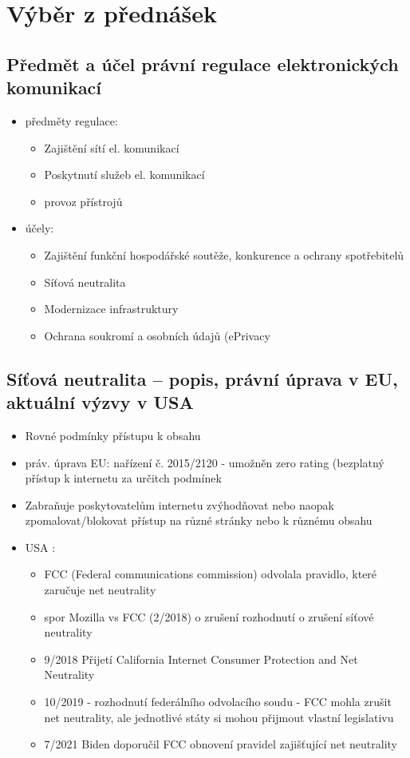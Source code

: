 \section{Výběr z přednášek}

\subsection{Předmět a účel právní regulace elektronických komunikací}
\begin{itemize}
    \item předměty regulace:
    \begin{itemize}
        \item Zajištění sítí el. komunikací
        \item Poskytnutí služeb el. komunikací
        \item provoz přístrojů
    \end{itemize}
    \item účely:
    \begin{itemize}
        \item Zajištění funkční hospodářské soutěže, konkurence a ochrany spotřebitelů
        \item Síťová neutralita
        \item Modernizace infrastruktury
        \item Ochrana soukromí a osobních údajů (ePrivacy
    \end{itemize}
\end{itemize}


\subsection{Síťová neutralita -- popis, právní úprava v EU, aktuální výzvy v USA}
\begin{itemize}
    \item Rovné podmínky přístupu k obsahu
    \item práv. úprava EU: nařízení č. 2015/2120 - umožněn zero rating (bezplatný přístup k internetu za určitch podmínek
    \item Zabraňuje poskytovatelům internetu zvýhodňovat nebo naopak zpomalovat/blokovat přístup na různé stránky nebo k různému obsahu
    \item USA : \begin{itemize}
        \item  FCC (Federal communications commission) odvolala pravidlo, které zaručuje net neutrality
        \item spor Mozilla vs FCC (2/2018) o zrušení rozhodnutí o zrušení síťové neutrality
        \item 9/2018 Přijetí California Internet Consumer Protection and Net Neutrality
        \item 10/2019 - rozhodnutí federálního odvolacího soudu - FCC mohla zrušit net neutrality, ale jednotlivé státy si mohou přijmout vlastní legislativu
        \item 7/2021 Biden doporučil FCC obnovení pravidel zajišťující net neutrality
    \end{itemize}
\end{itemize}


